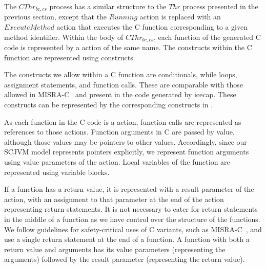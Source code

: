 
The $CThr_{bc,cs}$ process has a similar structure to the $Thr$
process presented in the previous section, except that the $Running$
action is replaced with an $ExecuteMethod$ action that executes the C
function corresponding to a given method identifier.
Within the body of $CThr_{bc,cs}$, each function of the generated C
code is represented by a \Circus{} action of the same name.
The constructs within the C function are represented using \Circus{}
constructs.

The constructs we allow within a C function are conditionals, while
loops, assignment statements, and function calls.
These are comparable with those allowed in MISRA-C~\cite{MISRA} and
present in the code generated by icecap.
These constructs can be represented by the corresponding constructs in
\Circus{}.

As each function in the C code is a \Circus{} action, function calls
are represented as references to those actions.
Function arguments in C are passed by value, although those values may
be pointers to other values.
Accordingly, since our SCJVM model represents pointers explicitly, we
represent function arguments using value parameters of the \Circus{}
action.
Local variables of the function are represented using \Circus{}
variable blocks.

If a function has a return value, it is represented with a result
parameter of the \Circus{} action, with an assignment to that
parameter at the end of the action representing return statements. 
It is not necessary to cater for return statements in the middle of a
function as we have control over the structure of the functions.
We follow guidelines for safety-critical uses of C variants, such as
MISRA-C~\cite{MISRA}, and use a single return statement at the end of
a function.
A function with both a return value and arguments has its value
parameters (representing the arguments) followed by the result
parameter (representing the return value).

